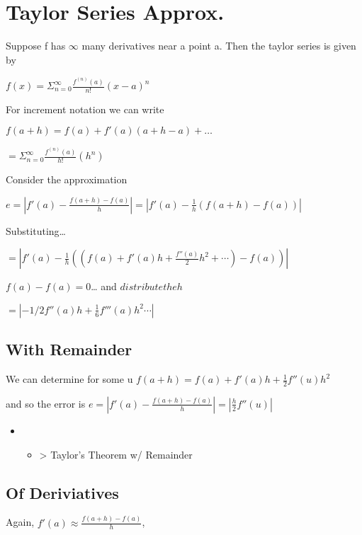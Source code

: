 \documentclass[11pt]{article}
\author{Elizabeth Hunt}
\date{\today}
\title{}
\begin{document}
\tableofcontents

\section{Taylor Series Approx.}
\label{sec:orgcc72ed1}
Suppose f has \(\infty\) many derivatives near a point a. Then the taylor series is given by

\(f(x) = \Sigma_{n=0}^{\infty} \frac{f^{(n)}(a)}{n!}(x-a)^n\)

For increment notation we can write

\(f(a + h) = f(a) + f'(a)(a+h - a) + \dots\)

\(= \Sigma_{n=0}^{\infty} \frac{f^{(n)}(a)}{h!} (h^n)\)

Consider the approximation

\(e = |f'(a) - \frac{f(a + h) - f(a)}{h}| = |f'(a) - \frac{1}{h}(f(a + h) - f(a))|\)

Substituting\ldots{}

\(= |f'(a) - \frac{1}{h}((f(a) + f'(a) h + \frac{f''(a)}{2} h^2 + \cdots) - f(a))|\)

\(f(a) - f(a) = 0\)\ldots{} and \(distribute the h\)

\(= |-1/2 f''(a) h + \frac{1}{6}f'''(a)h^2 \cdots|\)

\subsection{With Remainder}
\label{sec:org7dfd6c7}
We can determine for some u \(f(a + h) = f(a) + f'(a)h + \frac{1}{2}f''(u)h^2\)

and so the error is \(e = |f'(a) - \frac{f(a + h) - f(a)}{h}| = |\frac{h}{2}f''(u)|\)

\begin{itemize}
\item{}
\begin{itemize}
\item > Taylor's Theorem w/ Remainder
\end{itemize}
\end{itemize}


\subsection{Of Deriviatives}
\label{sec:org1ec7c9b}

Again, \(f'(a) \approx \frac{f(a+h) - f(a)}{h}\),
\end{document}
